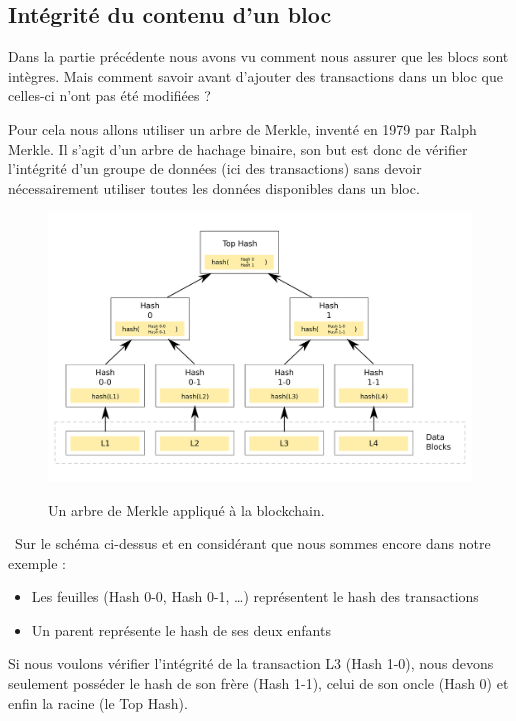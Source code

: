 \documentclass[12pt, a4paper, oneside]{book}
\begin{document}
    \subsection{Intégrité du contenu d’un bloc}

    Dans la partie précédente nous avons vu comment nous assurer que les blocs sont intègres. Mais comment savoir avant d’ajouter des transactions dans un bloc que celles-ci n’ont pas été modifiées ?
    
    Pour cela nous allons utiliser un arbre de Merkle, inventé en 1979 par Ralph Merkle. Il s’agit d’un arbre de hachage binaire, son but est donc de vérifier l’intégrité d’un groupe de données (ici des transactions) sans devoir nécessairement utiliser toutes les données disponibles dans un bloc.

    \begin{figure}[H]
        \begin{center}
          \includegraphics[width=\textwidth]{images/arbre.png}
          \label{fig:arbre}
          \caption{Un arbre de Merkle appliqué à la blockchain.}
        \end{center}
    \end{figure}
    \newpage
    \noindent~Sur le schéma ci-dessus et en considérant que nous sommes encore dans notre exemple :

    \begin{itemize}
        \item Les feuilles (Hash 0-0, Hash 0-1, …) représentent le hash des transactions
        \item Un parent représente le hash de ses deux enfants
        \newline
    \end{itemize}
    Si nous voulons vérifier l’intégrité de la transaction L3 (Hash 1-0), nous devons seulement posséder le hash de son frère (Hash 1-1), celui de son oncle (Hash 0) et enfin la racine (le Top Hash).
    
\end{document}
